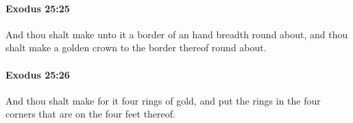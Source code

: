 		\paragraph{Exodus 25:25} %
			\label{EXODUS-25-25}

			And thou shalt make unto it a border of an hand breadth round about, and thou shalt make a golden crown to the border thereof round about.


		\paragraph{Exodus 25:26} %
			\label{EXODUS-25-26}

			And thou shalt make for it four rings of gold, and put the rings in the four corners that are on the four feet thereof.


